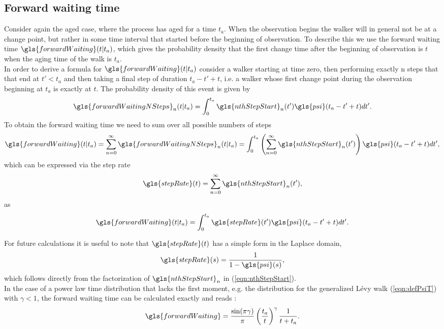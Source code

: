 \subsection{Forward waiting time}
Consider again the aged case, where the process has aged for a time $t_a$. When the observation begins the walker will in general not be at a change point, but rather in some time interval that started before the beginning of observation. To describe this we use the forward waiting time $\gls{forwardWaiting}(t|t_a)$, which gives the probability density that the first change time after the beginning of observation is $t$ when the aging time of the walk is $t_a$. \\

In order to derive a formula for $\gls{forwardWaiting}(t|t_a)$ consider a walker starting at time zero, then performing exactly n steps that that end at $t' < t_a$ and then taking a final step of duration $t_a-t'+t$, i.e. a walker whose first change point during the observation beginning at $t_a$ is exactly at $t$. The probability density of this event is given by
%
\begin{align}
\gls{forwardWaitingNSteps}_n(t|t_a) = \int^{t_a}_{0} \gls{nthStepStart}_n(t') \gls{psi}(t_a-t'+t) dt'.
\end{align}
%
To obtain the forward waiting time we need to sum over all possible numbers of steps 
%
\begin{align}
\gls{forwardWaiting}(t|t_a) = \sum_{n=0}^{\infty} \gls{forwardWaitingNSteps}_n(t|t_a) 
= \int^{t_a}_{0} \left( \sum_{n=0}^{\infty}  \gls{nthStepStart}_n(t') \right) \gls{psi}(t_a-t'+t) dt',
\end{align}
%
which can be expressed via the step rate
%
\begin{align}
\gls{stepRate}(t) =  \sum_{n=0}^{\infty}  \gls{nthStepStart}_n(t')  \label{eqn:stepRate},
\end{align}
%
as 
%
\begin{align}
\gls{forwardWaiting}(t|t_a) = \int^{t_a}_{0} \gls{stepRate}(t') \gls{psi}(t_a-t'+t) dt'.
\end{align}

For future calculations it is useful to note that $\gls{stepRate}(t)$ has a simple form in the Laplace domain,
%
\begin{align}
\gls{stepRate}(s) = \frac{1}{1-\gls{psi}(s)} ,
\end{align}
%
which follows directly from the factorization of $\gls{nthStepStart}_n$ in (\ref{eqn:nthStepStart}).\\

In the case of a power law time distribution that lacks the first moment, e.g. the distribution for the generalized L\'evy walk (\ref{eqn:defPsiT}) with $\gamma < 1$, the forward waiting time can be calculated exactly and reads \cite{firstSteps}:
%
\begin{align}
\gls{forwardWaiting} = \frac{\sin(\pi \gamma)}{\pi} \left( \frac{t_a}{t} \right)^{\gamma} \frac{1}{t+t_a} \label{eqn:forwardWaiting} .
\end{align}

